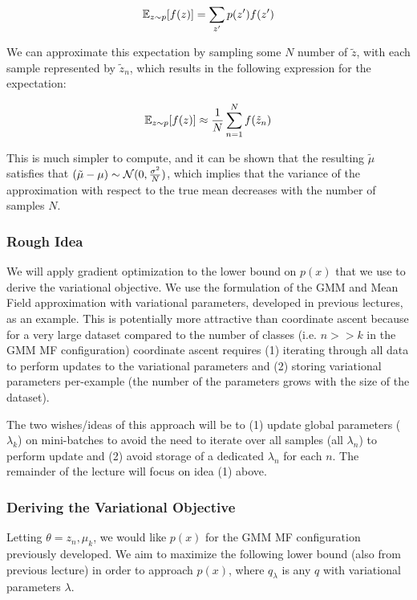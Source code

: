 \documentclass{article}
\begin{document}
$$
\mathbb{E}_{z \sim p}[f(z)] = \sum_{z'} p(z') f(z')
$$

We can approximate this expectation by sampling some $N$ number of $\tilde{z}$, with each sample represented by $\tilde{z}_n$, which results in the following expression for the expectation:

$$
\mathbb{E}_{z \sim p}[f(z)] \approx \frac{1}{N} \sum_{n=1}^{N} f(\tilde{z}_n)
$$

This is much simpler to compute, and it can be shown that the resulting $\tilde{\mu}$ satisfies that $(\tilde{\mu}- \mu) \sim \mathcal{N}(0, \frac{\sigma^2}{N})$, which implies that the variance of the approximation with respect to the true mean decreases with the number of samples $N$.

\subsubsection{Rough Idea}

We will apply gradient optimization to the lower bound on $p(x)$ that we use to derive the variational objective.  
We use the formulation of the GMM and Mean Field approximation with variational parameters, developed in previous lectures, as an example.  
This is potentially more attractive than coordinate ascent because for a very large dataset compared to the number of classes (i.e. $n >> k$ in the GMM MF configuration) coordinate ascent requires (1) iterating through all data to perform updates to the variational parameters and (2) storing variational parameters per-example (the number of the parameters grows with the size of the dataset).


The two wishes/ideas of this approach will be to (1) update global parameters ($\lambda_k$) on mini-batches to avoid the need to iterate over all samples (all $\lambda_n$) to perform update and (2) avoid storage of a dedicated $\lambda_n$ for each $n$.
The remainder of the lecture will focus on idea (1) above.


\subsubsection{Deriving the Variational Objective}

Letting $\theta = {z_n, \mu_k}$, we would like $p(x)$ for the GMM MF configuration previously developed.  
We aim to maximize the following lower bound (also from previous lecture) in order to approach $p(x)$, where $q_{\lambda}$ is any $q$ with variational parameters $\lambda$.
\end{document}
